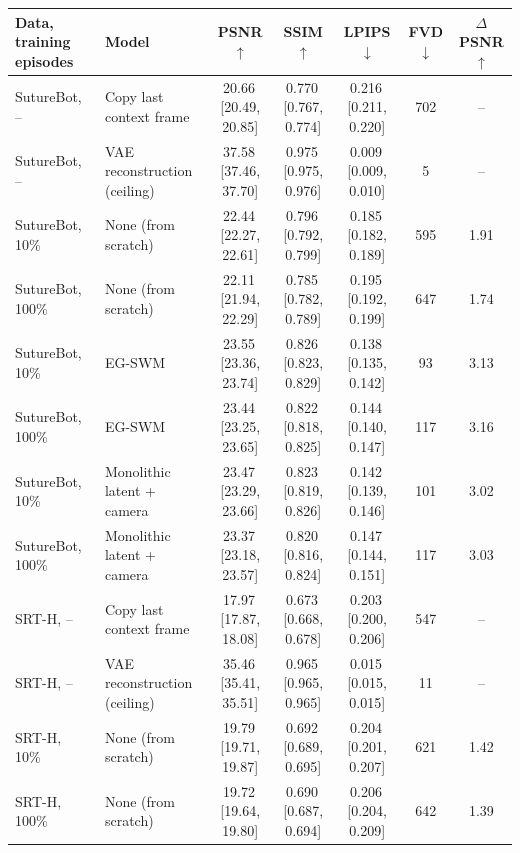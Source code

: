 \begin{tabular}{llccccc}
\toprule
Data, training episodes & Model & PSNR$\uparrow$ & SSIM$\uparrow$ & LPIPS$\downarrow$ & FVD$\downarrow$ & $\Delta$PSNR$\uparrow$ \\
\midrule
SutureBot, -- & Copy last context frame & 20.66\,{\scriptsize[20.49, 20.85]} & 0.770\,{\scriptsize[0.767, 0.774]} & 0.216\,{\scriptsize[0.211, 0.220]} & 702 & -- \\
SutureBot, -- & VAE reconstruction (ceiling) & 37.58\,{\scriptsize[37.46, 37.70]} & 0.975\,{\scriptsize[0.975, 0.976]} & 0.009\,{\scriptsize[0.009, 0.010]} & 5 & -- \\
SutureBot, 10\% & None (from scratch) & 22.44\,{\scriptsize[22.27, 22.61]} & 0.796\,{\scriptsize[0.792, 0.799]} & 0.185\,{\scriptsize[0.182, 0.189]} & 595 & 1.91 \\
SutureBot, 100\% & None (from scratch) & 22.11\,{\scriptsize[21.94, 22.29]} & 0.785\,{\scriptsize[0.782, 0.789]} & 0.195\,{\scriptsize[0.192, 0.199]} & 647 & 1.74 \\
SutureBot, 10\% & EG-SWM & 23.55\,{\scriptsize[23.36, 23.74]} & 0.826\,{\scriptsize[0.823, 0.829]} & 0.138\,{\scriptsize[0.135, 0.142]} & 93 & 3.13 \\
SutureBot, 100\% & EG-SWM & 23.44\,{\scriptsize[23.25, 23.65]} & 0.822\,{\scriptsize[0.818, 0.825]} & 0.144\,{\scriptsize[0.140, 0.147]} & 117 & 3.16 \\
SutureBot, 10\% & Monolithic latent + camera & 23.47\,{\scriptsize[23.29, 23.66]} & 0.823\,{\scriptsize[0.819, 0.826]} & 0.142\,{\scriptsize[0.139, 0.146]} & 101 & 3.02 \\
SutureBot, 100\% & Monolithic latent + camera & 23.37\,{\scriptsize[23.18, 23.57]} & 0.820\,{\scriptsize[0.816, 0.824]} & 0.147\,{\scriptsize[0.144, 0.151]} & 117 & 3.03 \\
\midrule
SRT-H, -- & Copy last context frame & 17.97\,{\scriptsize[17.87, 18.08]} & 0.673\,{\scriptsize[0.668, 0.678]} & 0.203\,{\scriptsize[0.200, 0.206]} & 547 & -- \\
SRT-H, -- & VAE reconstruction (ceiling) & 35.46\,{\scriptsize[35.41, 35.51]} & 0.965\,{\scriptsize[0.965, 0.965]} & 0.015\,{\scriptsize[0.015, 0.015]} & 11 & -- \\
SRT-H, 10\% & None (from scratch) & 19.79\,{\scriptsize[19.71, 19.87]} & 0.692\,{\scriptsize[0.689, 0.695]} & 0.204\,{\scriptsize[0.201, 0.207]} & 621 & 1.42 \\
SRT-H, 100\% & None (from scratch) & 19.72\,{\scriptsize[19.64, 19.80]} & 0.690\,{\scriptsize[0.687, 0.694]} & 0.206\,{\scriptsize[0.204, 0.209]} & 642 & 1.39 \\

\end{tabular}
